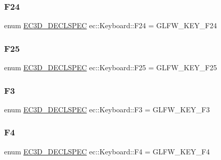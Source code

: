 \mbox{\label{classec_1_1_keyboard_af709a6fa5ab3d0e5069cf29f3f9861d3}} 
\subsubsection{\texorpdfstring{F24}{F24}}
{\footnotesize\ttfamily enum \mbox{\hyperlink{_common_8h_aac42573e202ca3dd4d259c81691e2369}{E\+C3\+D\+\_\+\+D\+E\+C\+L\+S\+P\+EC}} ec\+::\+Keyboard\+::\+F24 = G\+L\+F\+W\+\_\+\+K\+E\+Y\+\_\+\+F24}

\mbox{\label{classec_1_1_keyboard_a00ab8cfc0de951d98d759ddc214e2523}} 
\subsubsection{\texorpdfstring{F25}{F25}}
{\footnotesize\ttfamily enum \mbox{\hyperlink{_common_8h_aac42573e202ca3dd4d259c81691e2369}{E\+C3\+D\+\_\+\+D\+E\+C\+L\+S\+P\+EC}} ec\+::\+Keyboard\+::\+F25 = G\+L\+F\+W\+\_\+\+K\+E\+Y\+\_\+\+F25}

\mbox{\label{classec_1_1_keyboard_a3002ddc8f37c24a1429e22d5dc8e48aa}} 
\subsubsection{\texorpdfstring{F3}{F3}}
{\footnotesize\ttfamily enum \mbox{\hyperlink{_common_8h_aac42573e202ca3dd4d259c81691e2369}{E\+C3\+D\+\_\+\+D\+E\+C\+L\+S\+P\+EC}} ec\+::\+Keyboard\+::\+F3 = G\+L\+F\+W\+\_\+\+K\+E\+Y\+\_\+\+F3}

\mbox{\label{classec_1_1_keyboard_ad1f7f78c96c7a59a21210d94e693fde7}} 
\subsubsection{\texorpdfstring{F4}{F4}}
{\footnotesize\ttfamily enum \mbox{\hyperlink{_common_8h_aac42573e202ca3dd4d259c81691e2369}{E\+C3\+D\+\_\+\+D\+E\+C\+L\+S\+P\+EC}} ec\+::\+Keyboard\+::\+F4 = G\+L\+F\+W\+\_\+\+K\+E\+Y\+\_\+\+F4}

